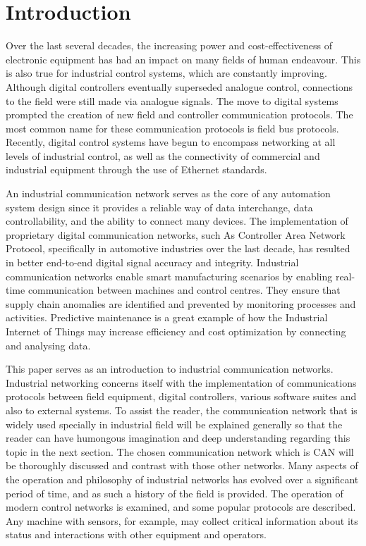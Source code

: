 \section{Introduction}

Over the last several decades, the increasing power and cost-effectiveness of electronic equipment has had an impact on many fields of human endeavour. This is also true for industrial control systems, which are constantly improving. Although digital controllers eventually superseded analogue control, connections to the field were still made via analogue signals. The move to digital systems prompted the creation of new field and controller communication protocols. The most common name for these communication protocols is field bus protocols. Recently, digital control systems have begun to encompass networking at all levels of industrial control, as well as the connectivity of commercial and industrial equipment through the use of Ethernet standards.

An industrial communication network serves as the core of any automation system design since it provides a reliable way of data interchange, data controllability, and the ability to connect many devices. The implementation of proprietary digital communication networks, such As Controller Area Network Protocol, specifically in automotive industries over the last decade, has resulted in better end-to-end digital signal accuracy and integrity. Industrial communication networks enable smart manufacturing scenarios by enabling real-time communication between machines and control centres. They ensure that supply chain anomalies are identified and prevented by monitoring processes and activities. Predictive maintenance is a great example of how the Industrial Internet of Things may increase efficiency and cost optimization by connecting and analysing data.

This paper serves as an introduction to industrial communication networks. Industrial networking concerns itself with the implementation of communications protocols between field equipment, digital controllers, various software suites and also to external systems. To assist the reader, the communication network that is widely used specially in industrial field will be explained generally so that the reader can have humongous imagination and deep understanding regarding this topic in the next section. The chosen communication network which is CAN will be thoroughly discussed and contrast with those other networks. Many aspects of the operation and philosophy of industrial networks has evolved over a significant period of time, and as such a history of the field is provided. The operation of modern control networks is examined, and some popular protocols are described. Any machine with sensors, for example, may collect critical information about its status and interactions with other equipment and operators.

